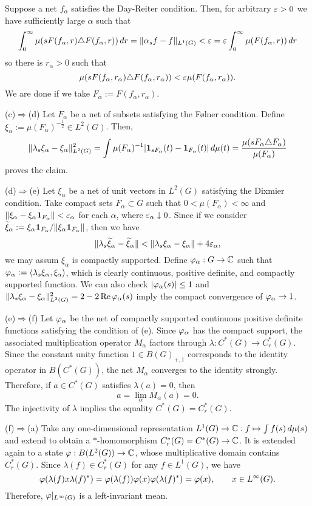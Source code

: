 \documentclass{../../../small}
\begin{document}
\begin{pf}
Suppose a net $f_\alpha$ satisfies the Day-Reiter condition.
Then, for arbitrary $\varepsilon>0$ we have sufficiently large $\alpha$ such that
\[\int_0^\infty\mu(sF(f_\alpha,r)\triangle F(f_\alpha,r))\,dr=\|\alpha_sf-f\|_{L^1(G)}<\varepsilon=\varepsilon\int_0^\infty\mu(F(f_\alpha,r))\,dr\]
so there is $r_\alpha>0$ such that
\[\mu(sF(f_\alpha,r_\alpha)\triangle F(f_\alpha,r_\alpha))<\varepsilon\mu(F(f_\alpha,r_\alpha)).\]
We are done if we take $F_\alpha:=F(f_\alpha,r_\alpha)$.

(c)$\Rightarrow$(d)
Let $F_\alpha$ be a net of subsets satisfying the F\o lner condition.
Define $\xi_\alpha:=\mu(F_\alpha)^{-\frac12}\in L^2(G)$.
Then,
\[\|\lambda_s\xi_\alpha-\xi_\alpha\|_{L^2(G)}^2=\int\mu(F_\alpha)^{-1}|\mathbf{1}_{sF_\alpha}(t)-\mathbf{1}_{F_\alpha}(t)|\,d\mu(t)=\frac{\mu(sF_\alpha\triangle F_\alpha)}{\mu(F_\alpha)}\]
proves the claim.

(d)$\Rightarrow$(e)
Let $\xi_\alpha$ be a net of unit vectors in $L^2(G)$ satisfying the Dixmier condition.
Take compact sets $F_\alpha\subset G$ such that $0<\mu(F_\alpha)<\infty$ and $\|\xi_\alpha-\xi_\alpha\mathbf{1}_{F_\alpha}\|<\varepsilon_\alpha$ for each $\alpha$, where $\varepsilon_\alpha\downarrow0$.
Since if we consider $\widetilde\xi_\alpha:=\xi_\alpha\mathbf{1}_{F_\alpha}/\|\xi_\alpha\mathbf{1}_{F_\alpha}\|$, then we have
\[\|\lambda_s\widetilde\xi_\alpha-\widetilde\xi_\alpha\|<\|\lambda_s\xi_\alpha-\xi_\alpha\|+4\varepsilon_\alpha,\]
we may assum $\xi_\alpha$ is compactly supported.
Define $\varphi_\alpha:G\to\mathbb{C}$ such that $\varphi_\alpha:=\langle\lambda_s\xi_\alpha,\xi_\alpha\rangle$, which is clearly continuous, positive definite, and compactly supported function.
We can also check $|\varphi_\alpha(s)|\le1$ and $\|\lambda_s\xi_\alpha-\xi_\alpha\|_{L^2(G)}^2=2-2\operatorname{Re}\varphi_\alpha(s)$ imply the compact convergence of $\varphi_\alpha\to1$.

(e)$\Rightarrow$(f)
Let $\varphi_\alpha$ be the net of compactly supported continuous positive definite functions satisfying the condition of (e).
Since $\varphi_\alpha$ has the compact support, the associated multiplication operator $M_\alpha$ factors through $\lambda:C^*(G)\to C_r^*(G)$.
Since the constant unity function $1\in B(G)_{+,1}$ corresponds to the identity operator in $B(C^*(G))$, the net $M_\alpha$ converges to the identity strongly.
Therefore, if $a\in C^*(G)$ satisfies $\lambda(a)=0$, then
\[a=\lim_\alpha M_\alpha(a)=0.\]
The injectivity of $\lambda$ implies the equality $C^*(G)=C_r^*(G)$.

(f)$\Rightarrow$(a)
Take any one-dimensional representation $L^1(G)\to\mathbb{C}:f\mapsto\int f(s)\,d\mu(s)$ and extend to obtain a $*$-homomorphism $C_r^*(G)=C^*(G)\to\mathbb{C}$.
It is extended again to a state $\varphi:B(L^2(G))\to\mathbb{C}$, whose multiplicative domain contains $C_r^*(G)$.
Since $\lambda(f)\in C_r^*(G)$ for any $f\in L^1(G)$, we have
\[\varphi(\lambda(f)x\lambda(f)^*)=\varphi(\lambda(f))\varphi(x)\varphi(\lambda(f)^*)=\varphi(x),\qquad x\in L^\infty(G).\]
Therefore, $\varphi|_{L^\infty(G)}$ is a left-invariant mean.
\end{pf}
\end{document}
